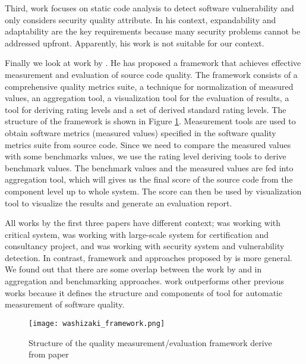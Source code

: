 Third, \cite{tjoa2015open} work focuses on static code analysis to detect software vulnerability and only considers security quality attribute. In his context, expandability and adaptability are the key requirements because many security problems cannot be addressed upfront. Apparently, his work is not suitable for our context.

Finally we look at work by \cite{washizaki2007framework}. He has proposed a framework that achieves effective measurement and evaluation of source code quality. The framework consists of a comprehensive quality metrics suite, a technique for normalization of measured values, an aggregation tool, a visualization tool for the evaluation of results, a tool for deriving rating levels and a set of derived standard rating levels. The structure of the framework is shown in Figure \ref{figure:washizaki_framework}. Measurement tools are used to obtain software metrics (measured values) specified in the software quality metrics suite from source code. Since we need to compare the measured values with some benchmarks values, we use the rating level deriving tools to derive benchmark values. The benchmark values and the measured values are fed into aggregation tool, which will gives us the final score of the source code from the component level up to whole system. The score can then be used by visualization tool to visualize the results and generate an evaluation report. 

All works by the first three papers have different context; \cite{cavano1978framework} was working with critical system, \cite{baggen2012standardized} was working with large-scale system for certification and consultancy project, and \cite{tjoa2015open} was working with security system and vulnerability detection. In contrast, framework and approaches proposed by \cite{washizaki2007framework} is more general. We found out that there are some overlap between the work by \cite{baggen2012standardized} and \cite{washizaki2007framework} in aggregation and benchmarking approaches. \cite{washizaki2007framework} work outperforms other previous works because it defines the structure and components of tool for automatic measurement of software quality.

\begin{figure}[t]
    \centering
    \texttt{[image: washizaki\_framework.png]}
    \caption{Structure of the quality measurement/evaluation framework derive from \cite{washizaki2007framework} paper}
    \label{figure:washizaki_framework}
\end{figure}

